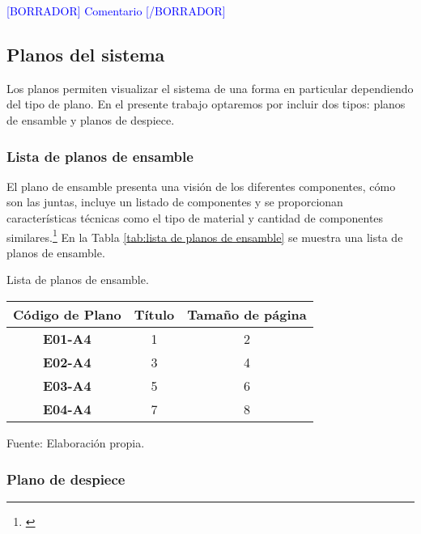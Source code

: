 \textcolor{blue}{[BORRADOR] Comentario [/BORRADOR]} 

\subsection{Planos del sistema}
\label{ssec:planos del sistema}

Los planos permiten visualizar el sistema de una forma en particular dependiendo del tipo de plano. En el presente trabajo optaremos por incluir dos tipos: planos de ensamble y planos de despiece.

\subsubsection{Lista de planos de ensamble}

El plano de ensamble presenta una visión de los diferentes componentes, cómo son las juntas, incluye un listado de componentes y se proporcionan características técnicas como el  tipo de material y cantidad de componentes similares.\footnote{\cite{Goetsch2010}} En la Tabla \ref{tab:lista de planos de ensamble} se muestra una lista de planos de ensamble.


\begin{mytable}[H]
	\footnotesize\centering
	\caption{Lista de planos de ensamble.}
	\label{tab:lista de planos de ensamble}
	\begin{tabular}{|c|c|c|}
		\hline
		\textbf{Código de Plano} & \textbf{Título} & \textbf{Tamaño de página} \\ \hline
		\textbf{E01-A4}        & 1              & 2             \\ \hline
		\textbf{E02-A4}        & 3              & 4             \\ \hline
		\textbf{E03-A4}        & 5              & 6             \\ \hline
		\textbf{E04-A4}        & 7              & 8             \\ \hline
	\end{tabular}
	\begin{myflushcenteraftertable}	
	Fuente: Elaboración propia.
	\end{myflushcenteraftertable}
\end{mytable}


\subsubsection{Plano de despiece}

